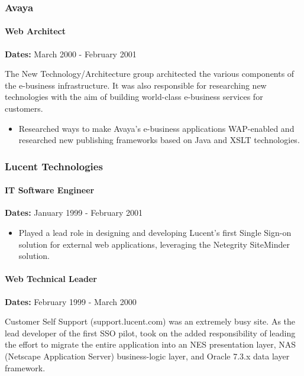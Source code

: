 \documentclass[
]{article}
\providecommand{\tightlist}{%
  \setlength{\itemsep}{0pt}\setlength{\parskip}{0pt}}
\renewcommand{\tightlist}{%
  \setlength{\itemsep}{0.12em}\setlength{\parskip}{0pt}\setlength{\parsep}{0pt}%
}
\begin{document}
\subsubsection{Avaya}\label{avaya}

\paragraph{Web Architect}\label{web-architect}

\textbf{Dates:} March 2000 - February 2001

The New Technology/Architecture group architected the various components
of the e-business infrastructure. It was also responsible for
researching new technologies with the aim of building world-class
e-business services for customers.

\begin{itemize}
\tightlist
\item
  Researched ways to make Avaya's e-business applications WAP-enabled
  and researched new publishing frameworks based on Java and XSLT
  technologies.
\end{itemize}

\subsubsection{Lucent Technologies}\label{lucent-technologies}

\paragraph{IT Software Engineer}\label{it-software-engineer}

\textbf{Dates:} January 1999 - February 2001

\begin{itemize}
\tightlist
\item
  Played a lead role in designing and developing Lucent's first Single
  Sign-on solution for external web applications, leveraging the
  Netegrity SiteMinder solution.
\end{itemize}

\paragraph{Web Technical Leader}\label{web-technical-leader}

\textbf{Dates:} February 1999 - March 2000

Customer Self Support (support.lucent.com) was an extremely busy site.
As the lead developer of the first SSO pilot, took on the added
responsibility of leading the effort to migrate the entire application
into an NES presentation layer, NAS (Netscape Application Server)
business-logic layer, and Oracle 7.3.x data layer framework.
\end{document}
